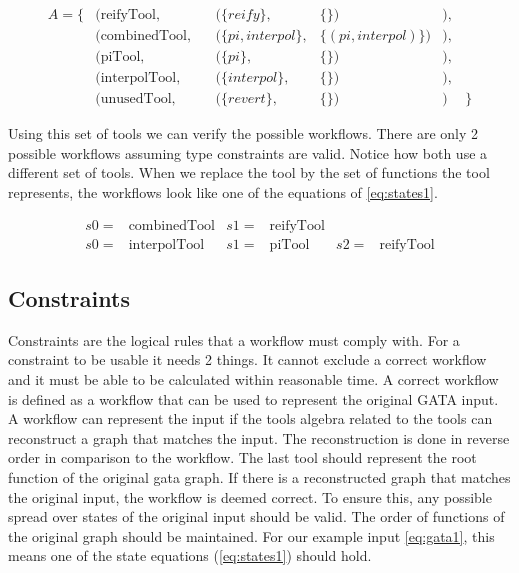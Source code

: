 \documentclass{article}
\begin{document}
\begin{align}
    A =  \{ & (\text{reifyTool},& & (\{reify \} ,& \{\})&), \nonumber\\ 
    & (\text{combinedTool},& & (\{pi,interpol \} ,& \{(pi,interpol)\})&), \nonumber\\ 
    & (\text{piTool},& & (\{pi \} ,& \{\})&), \nonumber\\ 
    & (\text{interpolTool},& & (\{interpol \} ,& \{\})&),\nonumber\\ 
    & (\text{unusedTool},& & (\{revert \} ,& \{\})&)   \label{eq:toolannotations}
    &\}
\end{align}

Using this set of tools we can verify the possible workflows. There are only 2 possible workflows assuming type constraints are valid. Notice how both use a different set of tools. When we replace the tool by the set of functions the tool represents, the workflows look like one of the equations of \ref{eq:states1}.

\begin{align}
    s0=& \text{combinedTool} & s1=&\text{reifyTool} & &  \label{eq:solution1}\\
    s0=& \text{interpolTool} & s1=&\text{piTool} & s2=&\text{reifyTool} \label{eq:solution2} 
\end{align}

\subsection{Constraints}


Constraints are the logical rules that a workflow must comply with.
For a constraint to be usable it needs 2 things. It cannot exclude a correct workflow and it must be able to be calculated within reasonable time. 
A correct workflow is defined as a workflow that can be used to represent the original GATA input. A workflow can represent the input if the tools algebra related to the tools can reconstruct a graph that matches the input. The reconstruction is done in reverse order in comparison to the workflow. The last tool should represent the root function of the original gata graph. If there is a reconstructed graph that matches the original input, the workflow is deemed correct. 
To ensure this, any possible spread over states of the original input should be valid. The order of functions of the original graph should be maintained. For our example input \ref{eq:gata1}, this means one of the state equations (\ref{eq:states1}) should hold. 
\end{document}
